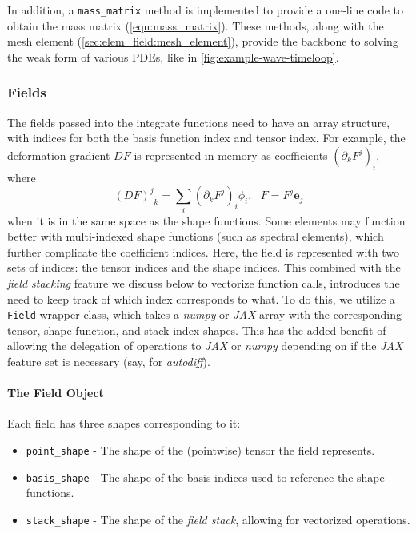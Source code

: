 In addition, a \verb+mass_matrix+ method is implemented to provide a one-line code to obtain the mass matrix (\ref{eqn:mass_matrix}). These methods, along with the mesh element (\ref{sec:elem_field:mesh_element}), provide the backbone to solving the weak form of various PDEs, like in \autoref{fig:example-wave-timeloop}.

\subsubsection{Fields} \label{sec:elem_field:fields}

The fields passed into the integrate functions need to have an array structure, with indices for both the basis function index and tensor index. For example, the deformation gradient $DF$ is represented in memory as coefficients $\left(\partial_k F^j\right)_i$, where
\begin{equation}
{(DF)^j}_{k} = \sum_i\left(\partial_k F^j\right)_i\phi_i,~~~F=F^j\mathbf{e}_j
\label{eqn:def_grad_discrete}
\end{equation}
when it is in the same space as the shape functions. Some elements may function better with multi-indexed shape functions (such as spectral elements), which further complicate the coefficient indices. Here, the field is represented with two sets of indices: the tensor indices and the shape indices. This combined with the \emph{field stacking} feature we discuss below to vectorize function calls, introduces the need to keep track of which index corresponds to what.
To do this, we utilize a \verb+Field+ wrapper class, which takes a \emph{numpy} or \emph{JAX} array with the corresponding tensor, shape function, and stack index shapes. This has the added benefit of allowing the delegation of operations to \emph{JAX} or \emph{numpy} depending on if the \emph{JAX} feature set is necessary (say, for \emph{autodiff}).

\paragraph{The Field Object}

Each field has three shapes corresponding to it:
\begin{itemize}
\item \verb+point_shape+ - The shape of the (pointwise) tensor the field represents.
\item \verb+basis_shape+ - The shape of the basis indices used to reference the shape functions.
\item \verb+stack_shape+ - The shape of the \emph{field stack}, allowing for vectorized operations.
\end{itemize}


